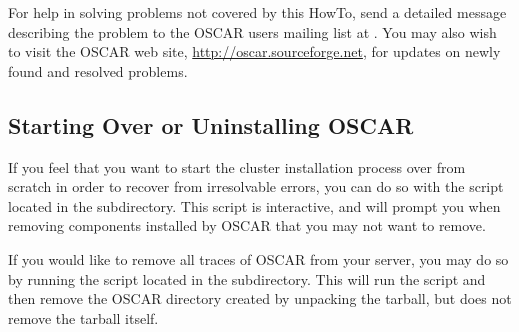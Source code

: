For help in solving problems not covered by this HowTo, send a
detailed message describing the problem to the OSCAR users mailing
list at . You may also wish
to visit the OSCAR web site, \url{http://oscar.sourceforge.net}, for
updates on newly found and resolved problems.

\subsection{Starting Over or Uninstalling OSCAR}

If you feel that you want to start the cluster installation process
over from scratch in order to recover from irresolvable errors, you
can do so with the  script located in the
 subdirectory. This script is interactive, and will
prompt you when removing components installed by OSCAR that you may
not want to remove.

If you would like to remove all traces of OSCAR from your server, you
may do so by running the  script located in the
 subdirectory. This will run the 
script and then remove the OSCAR directory created by unpacking the
tarball, but does not remove the tarball itself.

